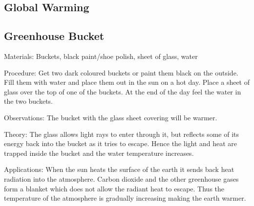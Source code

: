 \begin{multicols}{2}

\section*{Global Warming}  %


\subsection{Greenhouse Bucket} 


\begin{description*}
\item[Materials:]{Buckets, black paint/shoe polish, sheet of glass, water}
\item[Procedure:]{Get two dark coloured buckets or paint them black on the outside. Fill them with water and place them out in the sun on a hot day. Place a sheet of glass over the top of one of the buckets. At the end of the day feel the water in the two buckets.}
\item[Observations:]{The bucket with the glass sheet covering will be warmer.}
\item[Theory:]{The glass allows light rays to enter through it, but reflects some of its energy back into the bucket as it tries to escape. Hence the light and heat are trapped inside the bucket and the water temperature increases. }
\item[Applications:]{When the sun heats the surface of the earth it
sends back heat radiation into the atmosphere.
Carbon dioxide and the other greenhouse gases
form a blanket which does not allow the radiant
heat to escape. Thus the temperature of the
atmosphere is gradually increasing making the
earth warmer.}
\end{description*}


\end{multicols}
